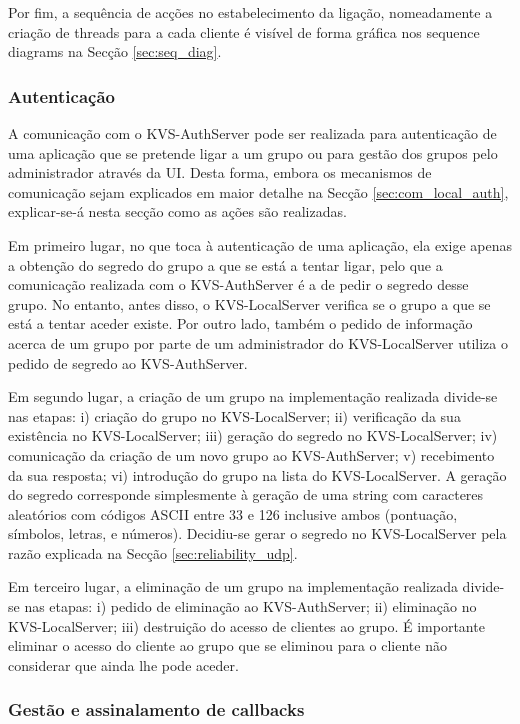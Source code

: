 Por fim, a sequência de acções no estabelecimento da ligação, nomeadamente a criação de threads para a cada cliente é visível de forma gráfica nos sequence diagrams na Secção \ref{sec:seq_diag}.

\subsubsection{Autenticação}

A comunicação com o KVS-AuthServer pode ser realizada para autenticação de uma aplicação que se pretende ligar a um grupo ou para gestão dos grupos pelo administrador através da UI. Desta forma, embora os mecanismos de comunicação sejam explicados em maior detalhe na Secção \ref{sec:com_local_auth}, explicar-se-á nesta secção como as ações são realizadas.

Em primeiro lugar, no que toca à autenticação de uma aplicação, ela exige apenas a obtenção do segredo do grupo a que se está a tentar ligar, pelo que a comunicação realizada com o KVS-AuthServer é a de pedir o segredo desse grupo. No entanto, antes disso, o KVS-LocalServer verifica se o grupo a que se está a tentar aceder existe. Por outro lado, também o pedido de informação acerca de um grupo por parte de um administrador do KVS-LocalServer utiliza o pedido de segredo ao KVS-AuthServer.

Em segundo lugar, a criação de um grupo na implementação realizada divide-se nas etapas: i) criação do grupo no KVS-LocalServer; ii) verificação da sua existência no KVS-LocalServer; iii) geração do segredo no KVS-LocalServer; iv) comunicação da criação de um novo grupo ao KVS-AuthServer; v) recebimento da sua resposta; vi) introdução do grupo na lista do KVS-LocalServer. A geração do segredo corresponde simplesmente à geração de uma string com caracteres aleatórios com códigos ASCII entre 33 e 126 inclusive ambos (pontuação, símbolos, letras, e números). Decidiu-se gerar o segredo no KVS-LocalServer pela razão explicada na Secção \ref{sec:reliability_udp}.

Em terceiro lugar, a eliminação de um grupo na implementação realizada divide-se nas etapas: i) pedido de eliminação ao KVS-AuthServer; ii) eliminação no KVS-LocalServer; iii) destruição do acesso de clientes ao grupo. É importante eliminar o acesso do cliente ao grupo que se eliminou para o cliente não considerar que ainda lhe pode aceder.

\subsubsection{Gestão e assinalamento de callbacks}\label{sec:gestao_cb_local}


